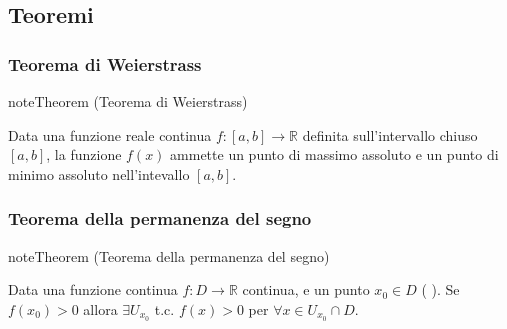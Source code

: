 \documentclass[letterpaper,10pt,italian]{jupyterBook}
\begin{document}
\subsection{Teoremi}
\label{\detokenize{ch/infinitesimal_calculus/analysis:teoremi}}\label{\detokenize{ch/infinitesimal_calculus/analysis:infinitesimal-calculus-continuous-fun-thms}}

\subsubsection{Teorema di Weierstrass}
\label{\detokenize{ch/infinitesimal_calculus/analysis:teorema-di-weierstrass}}\label{\detokenize{ch/infinitesimal_calculus/analysis:infinitesimal-calculus-continuous-fun-thms-weierstrass}}\label{None:thm:infinitesimal-calculus:continuous-fun:thms:weierstrass}
\begin{sphinxadmonition}{note}{Theorem  (Teorema di Weierstrass)}



\sphinxAtStartPar
Data una funzione reale continua \(f: [a,b] \rightarrow \mathbb{R}\) definita sull’intervallo chiuso \([a,b]\), la funzione \(f(x)\) ammette un punto di massimo assoluto e un punto di minimo assoluto nell’intevallo \([a,b]\).
\end{sphinxadmonition}

\sphinxAtStartPar
{} 


\subsubsection{Teorema della permanenza del segno}
\label{\detokenize{ch/infinitesimal_calculus/analysis:teorema-della-permanenza-del-segno}}\label{\detokenize{ch/infinitesimal_calculus/analysis:infinitesimal-calculus-continuous-fun-thms-sign}}\label{None:thm:infinitesimal-calculus:continuous-fun:thms:sign}
\begin{sphinxadmonition}{note}{Theorem  (Teorema della permanenza del segno)}



\sphinxAtStartPar
Data una funzione continua \(f: D \rightarrow \mathbb{R}\) continua, e un punto \(x_0 \in D\) ( ). Se \(f(x_0) > 0\) allora \(\exists U_{x_0}\) t.c. \(f(x) > 0\) per \(\forall x \in U_{x_0} \cap D\).
\end{sphinxadmonition}
\end{document}
